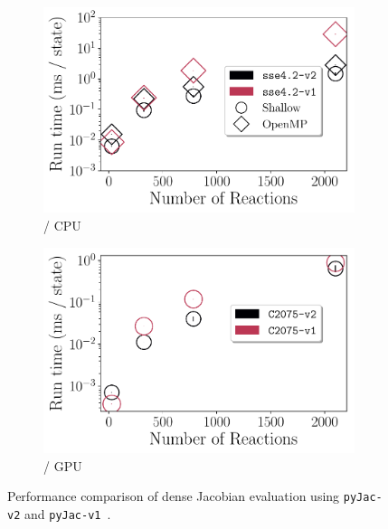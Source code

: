 \documentclass[12pt,number,sort&compress,preprint]{elsarticle}
\begin{document}
\begin{figure}[htbp]
   \centering
  \begin{subfigure}[t]{0.48\linewidth}
      \includegraphics[width=\textwidth]{v1_vs_v2.pdf}
      \caption{\sse/ CPU}
      \label{F:v1_vs_v2_cpu}
  \end{subfigure}
  \hfill
  \begin{subfigure}[t]{0.48\linewidth}
      \includegraphics[width=\textwidth]{v1_vs_v2_gpu.pdf}
      \caption{\gpuold/ GPU}
      \label{F:v1_vs_v2_gpu}
  \end{subfigure}
  \caption{Performance comparison of dense Jacobian evaluation using \texttt{pyJac-v2} and \texttt{pyJac-v1}~\cite{pyjac16}.}
  \label{F:v1_vs_v2}
\end{figure}
\end{document}
